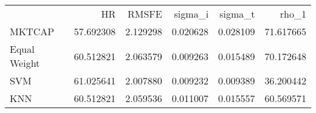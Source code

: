 \begin{tabular}{lrrrrr}
 & HR &  RMSFE & sigma_i & sigma_t & rho_1 \\
MKTCAP & 57.692308 & 2.129298 & 0.020628 & 0.028109 & 71.617665 \\
Equal Weight & 60.512821 & 2.063579 & 0.009263 & 0.015489 & 70.172648 \\
SVM & 61.025641 & 2.007880 & 0.009232 & 0.009389 & 36.200442 \\
KNN & 60.512821 & 2.059536 & 0.011007 & 0.015557 & 60.569571 \\
\end{tabular}
